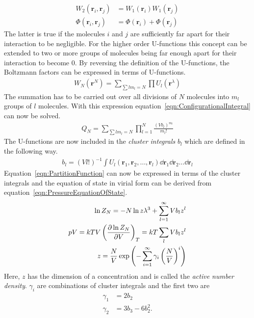 %
\begin{align}
    W_2\left(\mathbf{r}_i,\mathbf{r}_j\right)&=W_1\left(\mathbf{r}_i\right)W_1\left(\mathbf{r}_j\right)\\
    \Phi\left(\mathbf{r}_i,\mathbf{r}_j\right)&=\Phi\left(\mathbf{r}_i\right)+\Phi\left(\mathbf{r}_j\right)
\end{align}
%
The latter is true if the molecules $i$ and $j$ are sufficiently far apart for
their interaction to be negligible. For the higher order U-functions this
concept can be extended to two or more groups of molecules being far enough
apart for their interaction to become 0. By reversing the definition of the
U-functions, the Boltzmann factors can be expressed in terms of U-functions.
%
\begin{align}
    W_N\left(\mathbf{r}^N\right)=\sum_{\sum lm_l=N}\prod U_l\left(\mathbf{r}^\lambda\right)
\end{align}
%
The summation has to be carried out over all divisions of $N$ molecules into
$m_l$ groups of $l$ molecules. With this expression
equation~\eqref{eqn:ConfigurationalIntegral} can now be solved.
%
\begin{align}
    Q_N = \sum_{\sum lm_l=N} \prod_{l=1}^N\frac{(Vb_l)^{m_l}}{m_l!}\label{eqn:ConfigurationIntegralbl}
\end{align}
%
The U-functions are now included in the \textit{cluster integrals} $b_l$ which
are defined in the following way.
%
\begin{align}
    b_l=\left(Vl!\right)^{-1}\int U_l(\mathbf{r}_1,\mathbf{r}_2,\dots,\mathbf{r}_l)\dd{\mathbf{r}_1}\dd{\mathbf{r}_2}\dots\dd{\mathbf{r}_l}
\end{align}
%
Equation~\eqref{eqn:PartitionFunction} can now be expressed in terms of the
cluster integrals and the equation of state in virial form can be derived from
equation~\eqref{eqn:PressureEquationOfState}.
%
\begin{align}
    \ln Z_N=-N\ln z\lambda^3 + \sum_{l=1}^\infty Vb_lz^l\\
    pV=kTV\left(\pdv{\ln Z_N}{V}\right)_T=kT\sum_lVb_lz^l\\
    z=\frac{N}{V}\exp\left(-\sum_{i=1}^\infty\gamma_i\left(\frac{N}{V}\right)^i\right)
\end{align}
%
Here, $z$ has the dimension of a concentration and is called the \textit{active
number density}. $\gamma_i$ are combinations of cluster integrals and the first
two are
%
\begin{align}
    \gamma_1&=2b_2\\
    \gamma_2&=3b_3-6b_2^2.
\end{align}
